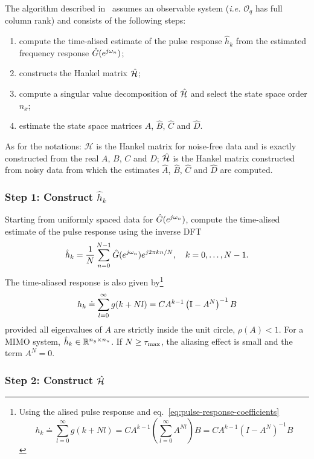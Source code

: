 The algorithm described in~\cite{mckelvey} assumes an observable system (\textit{i.e.} $\mathcal{O}_q$ has full column rank) and consists of the following steps:
\begin{enumerate}
\item compute the time-alised estimate of the pulse response $\hat{h}_k$ from the estimated frequency response $\hat{G}(e^{j\omega_n})$;
\item constructs the Hankel matrix $\hat{\mathcal{H}}$;
\item compute a singular value decomposition of $\hat{\mathcal{H}}$ and select the state space order $\hat{n}_x$;
\item estimate the state space matrices $\hat{A}$, $\hat{B}$, $\hat{C}$ and $\hat{D}$.
\end{enumerate}
As for the notations: $\mathcal{H}$ is the Hankel matrix for noise-free data and is exactly constructed from the real $A$, $B$, $C$ and $D$; $\hat{\mathcal{H}}$ is the Hankel matrix constructed from noisy data from which the estimates $\hat{A}$, $\hat{B}$, $\hat{C}$ and $\hat{D}$ are computed.

\subsubsection{Step 1: Construct $\hat{h}_k$}

Starting from uniformly spaced data for $\hat{G}(e^{j\omega_n})$, compute the time-alised estimate of the pulse response using the inverse DFT
\begin{equation*}
  \hat{h}_k = \frac{1}{N} \sum_{n=0}^{N-1} \hat{G}(e^{j\omega_n}) e^{j2\pi kn/N},\hspace{1em}k = 0,\ldots , N-1.
\end{equation*}
The time-aliased response is also given by\footnote{Using the alised pulse response and eq.~\eqref{eq:pulse-response-coefficients}
  \begin{equation*}
    h_k \doteq \sum_{l=0}^\infty g(k+Nl) = CA^{k-1} \left(\sum_{l=0}^\infty A^{Nl}\right) B = CA^{k-1} \left(I - A^N\right)^{-1}B
  \end{equation*}}
\begin{equation*}
  h_k \doteq \sum_{l=0}^\infty g(k+Nl) = CA^{k-1} \left(\mathbb{I} - A^N\right)^{-1}B
\end{equation*}
provided all eigenvalues of $A$ are strictly inside the unit circle, $\rho(A)<1$. For a MIMO system, $\hat{h}_k \in \mathbb{R}^{n_y\times n_u}$. If $N \geq \tau_\text{max}$, the aliasing effect is small and the term $A^N = 0$.

\subsubsection{Step 2: Construct $\hat{\mathcal{H}}$}

